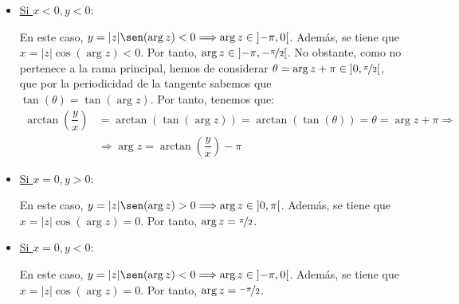 \begin{ejercicio}
\begin{itemize}
        \item \ul{Si $x<0, y<0$}:
        
        En este caso, $y=|z|\sen(\arg z)<0\Longrightarrow \arg z\in \left]-\pi,0\right[$. Además, se tiene que $x=|z|\cos(\arg z)<0$. Por tanto, $\arg z\in \left]-\pi,-\nicefrac{\pi}{2}\right[$. No obstante, como no pertenece a la rama principal, hemos de considerar $\theta = \arg z + \pi\in \left]0,\nicefrac{\pi}{2}\right[$, que por la periodicidad de la tangente sabemos que $\tan(\theta)=\tan(\arg z)$. Por tanto, tenemos que:
        \begin{align*}
            \arctan\left(\dfrac{y}{x}\right) &= \arctan\left(\tan(\arg z)\right) = \arctan\left(\tan(\theta)\right) = \theta = \arg z + \pi
            \Longrightarrow\\&\Longrightarrow
            \arg z = \arctan\left(\dfrac{y}{x}\right) - \pi
        \end{align*}

        \item \ul{Si $x=0, y>0$}:
        
        En este caso, $y=|z|\sen(\arg z)>0\Longrightarrow \arg z\in \left]0,\pi\right[$. Además, se tiene que $x=|z|\cos(\arg z)=0$. Por tanto, $\arg z=\nicefrac{\pi}{2}$.

        \item \ul{Si $x=0, y<0$}:
        
        En este caso, $y=|z|\sen(\arg z)<0\Longrightarrow \arg z\in \left]-\pi,0\right[$. Además, se tiene que $x=|z|\cos(\arg z)=0$. Por tanto, $\arg z=\nicefrac{-\pi}{2}$.
    \end{itemize}
\end{ejercicio}

